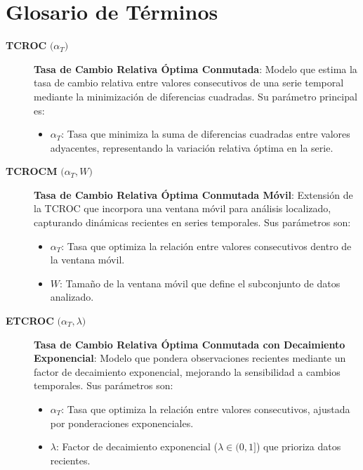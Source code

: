 \chapter*{Glosario de Términos}
\label{glosario}

\begin{description}
\item[\textbf{TCROC} \(\bigl(\alpha_T\bigr)\)] 
\textbf{Tasa de Cambio Relativa Óptima Conmutada}:  
Modelo que estima la tasa de cambio relativa entre valores consecutivos de una serie temporal mediante la minimización de diferencias cuadradas. Su parámetro principal es:
\begin{itemize}
  \item \(\alpha_T\): Tasa que minimiza la suma de diferencias cuadradas entre valores adyacentes, representando la variación relativa óptima en la serie.
\end{itemize}

\item[\textbf{TCROCM} \(\bigl(\alpha_T, W\bigr)\)] 
\textbf{Tasa de Cambio Relativa Óptima Conmutada Móvil}:  
Extensión de la TCROC que incorpora una ventana móvil para análisis localizado, capturando dinámicas recientes en series temporales. Sus parámetros son:
\begin{itemize}
  \item \(\alpha_T\): Tasa que optimiza la relación entre valores consecutivos dentro de la ventana móvil.
  \item \(W\): Tamaño de la ventana móvil que define el subconjunto de datos analizado.
\end{itemize}

\item[\textbf{ETCROC} \(\bigl(\alpha_T, \lambda\bigr)\)] 
\textbf{Tasa de Cambio Relativa Óptima Conmutada con Decaimiento Exponencial}:  
Modelo que pondera observaciones recientes mediante un factor de decaimiento exponencial, mejorando la sensibilidad a cambios temporales. Sus parámetros son:
\begin{itemize}
  \item \(\alpha_T\): Tasa que optimiza la relación entre valores consecutivos, ajustada por ponderaciones exponenciales.
  \item \(\lambda\): Factor de decaimiento exponencial (\(\lambda \in (0,1]\)) que prioriza datos recientes.
\end{itemize}


\end{description}
